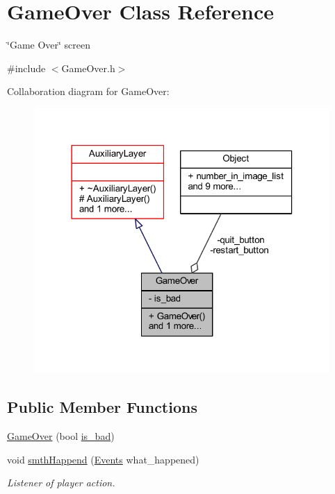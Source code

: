 \hypertarget{class_game_over}{}\section{Game\+Over Class Reference}
\label{class_game_over}


\char`\"{}\+Game Over\char`\"{} screen  




{\ttfamily \#include $<$Game\+Over.\+h$>$}



Collaboration diagram for Game\+Over\+:
\nopagebreak
\begin{figure}[H]
\begin{center}
\leavevmode
\includegraphics[width=318pt]{class_game_over__coll__graph}
\end{center}
\end{figure}
\subsection*{Public Member Functions}
\begin{DoxyCompactItemize}
\item 
\hyperlink{class_game_over_a3eb13fd94a63ff6dace1e1265b0c535d}{Game\+Over} (bool \hyperlink{class_game_over_a4a7103cf4db129cad83b0c001c32d116}{is\+\_\+bad})
\item 
void \hyperlink{class_game_over_a919e7ac37c476bf288f732f9a8106016}{smth\+Happend} (\hyperlink{_events_8h_af60e00b78607064c5be6aa9397ea49c1}{Events} what\+\_\+happened)
\begin{DoxyCompactList}\small\item\em Listener of player action. \end{DoxyCompactList}\end{DoxyCompactItemize}
